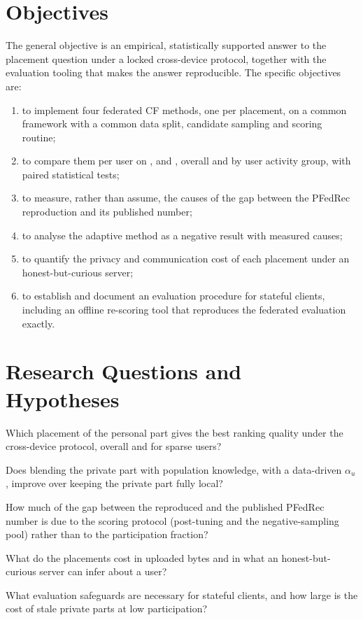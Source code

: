 \section{Objectives}
\label{sec:intro-objectives}

The general objective is an empirical, statistically supported answer to the placement question
under a locked cross-device protocol, together with the evaluation tooling that makes the answer
reproducible. The specific objectives are:

\begin{enumerate}[label=O\arabic*, leftmargin=2.5em]
  \item to implement four federated CF methods, one per placement, on a common framework with a
        common data split, candidate sampling and scoring routine;
  \item to compare them per user on \ndcg{}, \hr{} and \mrr{}, overall and by user activity
        group, with paired statistical tests;
  \item to measure, rather than assume, the causes of the gap between the PFedRec reproduction
        and its published number;
  \item to analyse the adaptive method as a negative result with measured causes;
  \item to quantify the privacy and communication cost of each placement under an
        honest-but-curious server;
  \item to establish and document an evaluation procedure for stateful clients, including an
        offline re-scoring tool that reproduces the federated evaluation exactly.
\end{enumerate}

\section{Research Questions and Hypotheses}
\label{sec:intro-rq}

\begin{description}[leftmargin=3em, style=nextline]
  \item[RQ1] Which placement of the personal part gives the best ranking quality under the
        cross-device protocol, overall and for sparse users?
  \item[RQ2] Does blending the private part with population knowledge, with a data-driven
        $\alpha_u$, improve over keeping the private part fully local?
  \item[RQ3] How much of the gap between the reproduced and the published PFedRec number is due
        to the scoring protocol (post-tuning and the negative-sampling pool) rather than to the
        participation fraction?
  \item[RQ4] What do the placements cost in uploaded bytes and in what an honest-but-curious
        server can infer about a user?
  \item[RQ5] What evaluation safeguards are necessary for stateful clients, and how large is the
        cost of stale private parts at low participation?
\end{description}

